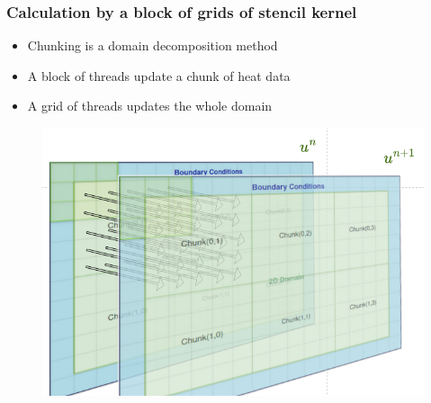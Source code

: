 \documentclass[9pt]{beamer}
\begin{document}
\begin{frame}
\frametitle{Calculation by a block of grids of stencil kernel}
\begin{itemize}

    \item Chunking is a domain decomposition method
    \item A block of threads update a chunk of heat data
    \item A grid of threads updates the whole domain
\end{itemize}
\begin{figure}
    \centering
    \includegraphics[width=0.75\linewidth]{Screenshot from 2024-09-04 13-55-10.png}
\end{figure}
\end{frame}
\end{document}
